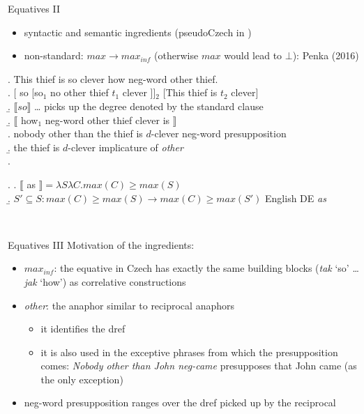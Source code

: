 \documentclass[
  ignorenonframetext,
]{beamer}
\providecommand{\tightlist}{%
  \setlength{\itemsep}{0pt}\setlength{\parskip}{0pt}}\usepackage{longtable,booktabs,array}
\begin{document}
\begin{frame}
\begin{block}{Equatives II}
\protect\hypertarget{equatives-ii}{}
\begin{itemize}
\tightlist
\item
  syntactic and semantic ingredients (pseudoCzech in \Next)
\item
  non-standard: \(max \rightarrow max_{inf}\) (otherwise \(max\) would
  lead to \(\bot\)): Penka (2016)
\end{itemize}

\ex. This thief is so clever how neg-word other thief.\\
\a. {[} so {[}so\(_1\) no other thief \(t_1\) clever {]}{]}\(_2\)
{[}This thief is \(t_2\) clever{]}\\
\b. \(\llbracket so\rrbracket\) \ldots{} picks up the degree denoted by
the standard clause\\
\b. \(\llbracket\) how\(_1\) neg-word other thief clever is
\(\rrbracket\)\\
\a. nobody other than the thief is \(d\)-clever \hfill neg-word
presupposition\\
\b. the thief is \(d\)-clever \hfill implicature of \emph{other}\\
\z.

\ex. \a. \(\llbracket\) as
\(\rrbracket = \lambda S\lambda C.max(C) \geq max(S)\)\\
\b.
\(S' \subseteq S: max(C) \geq max(S) \rightarrow max(C) \geq max(S')\)
\hfill English DE \textit{as}

~
\end{block}
\end{frame}

\begin{frame}
\begin{block}{Equatives III}
\protect\hypertarget{equatives-iii}{}
Motivation of the ingredients:

\begin{itemize}
\tightlist
\item
  \(max_{inf}\): the equative in Czech has exactly the same building
  blocks (\emph{tak} `so' \ldots{} \emph{jak} `how') as correlative
  constructions
\item
  \emph{other}: the anaphor similar to reciprocal anaphors

  \begin{itemize}
  \tightlist
  \item
    it identifies the dref
  \item
    it is also used in the exceptive phrases from which the
    presupposition comes: \emph{Nobody other than John neg-came}
    presupposes that John came (as the only exception)
  \end{itemize}
\item
  neg-word presupposition ranges over the dref picked up by the
  reciprocal
\end{itemize}
\end{block}
\end{frame}
\end{document}
